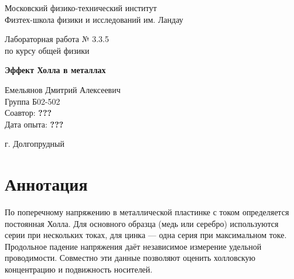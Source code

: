 \documentclass[a4paper,12pt]{article}
\newcommand{\qq}{\textbf{???}}
\begin{document}
\begin{titlepage}\centering
{\large Московский физико-технический институт\\
Физтех-школа физики и исследований им. Ландау}\par
\vfill
{\Large Лабораторная работа № 3.3.5\\ по курсу общей физики}\par\bigskip
{\huge\bfseries Эффект Холла в металлах}\par
\vfill
\begin{flushright}Емельянов Дмитрий Алексеевич\\Группа Б02-502\\
Соавтор: \qq\\Дата опыта: \qq\end{flushright}
\vfill г. Долгопрудный
\end{titlepage}

\section*{Аннотация}
По поперечному напряжению в металлической пластинке с током определяется постоянная Холла. Для основного образца (медь или серебро) используются серии при нескольких токах, для цинка --- одна серия при максимальном токе. Продольное падение напряжения даёт независимое измерение удельной проводимости. Совместно эти данные позволяют оценить холловскую концентрацию и подвижность носителей.
\end{document}
